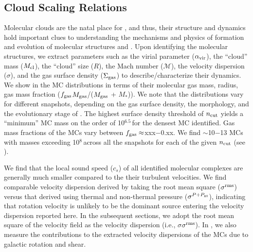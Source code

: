 \documentclass[apj]{emulateapj} %
\begin{document}
\subsection{Cloud Scaling Relations} 
Molecular clouds are the natal place for \SF, and thus,
their structure and dynamics hold important clues to understanding 
the mechanisms and physics of formation and evolution of molecular structures and \SF.
Upon identifying the molecular structures, we extract parameters such as
the virial parameter ($\alpha_{\rm vir}$), 
the ``cloud'' mass ($M_{\rm cl}$), 
the ``cloud'' size ($R$),  
the Mach number ($\mathcal{M}$), 
the velocity dispersion ($\sigma$), and the 
gas surface density ($\Sigma_{\rm gas}$)
to describe/characterize their dynamics.
We show in \Fig{} the MC distributions in terms of their 
molecular gas mass, radius, gas mass fraction ($f_{\rm gas}$\eq$M_{\rm gas}$/($M_{\rm gas}$ + 
$M_*$)). 
We note that the distributions vary for different snapshots, depending on
the gas surface density, the morphology, and the evolutionary stage of \flower.
The highest surface density threshold of $n_{\rm cut}$ yields a ``minimum'' MC mass on
the order of 10$^{6.5}$\,\Msun for the densest MC identified.
Gas mass fractions of the MCs vary between $f_{\rm gas}\approx$xxx$-$0.xx. 
We find $\sim$10$-$13 MCs with masses exceeding 10$^8$\,\Msun across all the 
snapshots for each of the given $n_{\rm cut}$ (see ).

We find that the local sound speed ($c_s$) 
of all identified molecular complexes are generally much smaller compared to the their
turbulent velocities.
We find comparable velocity dispersion derived by taking the root mean square ($\sigma^{\rm rms}$) versus
that derived using thermal and non-thermal pressure ($\sigma^{P+P_{\rm nt}}$), indicating that 
rotation velocity is unlikely to be the dominant source entering the velocity dispersion reported here.
In the subsequent sections, we adopt the root mean square of the velocity field
as the velocity dispersion (i.e., $\sigma$\eq$\sigma^{\rm rms}$).
In , we also measure the contributions to the extracted velocity dispersions of the 
MCs due to galactic rotation and shear.
\end{document}
